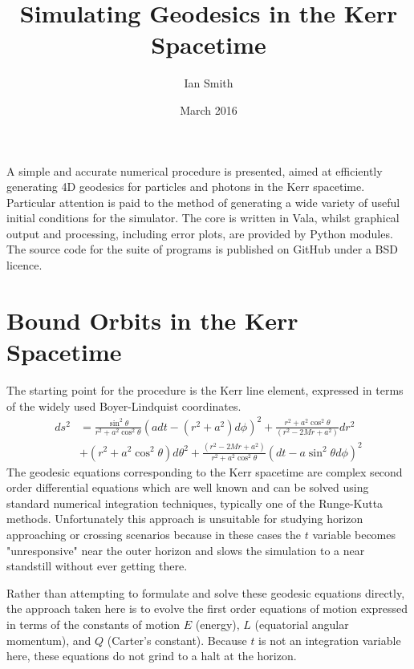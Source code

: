 \documentclass[11pt]{article}
\title{\textbf{Simulating Geodesics in the Kerr Spacetime}}
\author{Ian Smith}
\date{March 2016}
\begin{document}
\maketitle

\abstract
A simple and accurate numerical procedure is presented, aimed at efficiently generating 4D geodesics for particles and photons in the Kerr spacetime.  Particular attention is paid to the method of generating a wide variety of useful initial conditions for the simulator.  The core is written in Vala, whilst graphical output and processing, including error plots, are provided by Python modules.  The source code for the suite of programs is published on GitHub under a BSD licence.

\section{Bound Orbits in the Kerr Spacetime}

The starting point for the procedure is the Kerr line element, expressed in terms of the widely used Boyer-Lindquist coordinates.
\begin{equation}
\begin{aligned}
d s^2 &= \frac{ \sin^2 \theta } {r^2 + a^2 \cos^2 \theta} (a dt - (r^2 + a^2)d \phi )^2 + \frac{ r^2 + a^2 \cos^2 \theta } {(r^2 - 2Mr  + a^2)} d r^2 \\
&+ (r^2 + a^2 \cos^2 \theta) d \theta^2 + \frac{ (r^2 - 2Mr  + a^2) } {r^2 + a^2 \cos^2 \theta} (dt - a \sin^2 \theta d \phi )^2
\end{aligned}
\end{equation}
The geodesic equations corresponding to the Kerr spacetime are complex second order differential equations which are well known and can be solved using standard numerical integration techniques, typically one of the Runge-Kutta methods.  Unfortunately this approach is unsuitable for studying horizon approaching or crossing scenarios because in these cases the $t$ variable becomes "unresponsive" near the outer horizon and slows the simulation to a near standstill without ever getting there.

Rather than attempting to formulate and solve these geodesic equations directly, the approach taken here is to evolve the first order equations of motion expressed in terms of the constants of motion $E$ (energy), $L$ (equatorial angular momentum), and $Q$ (Carter's constant).  Because $t$ is not an integration variable here, these equations do not grind to a halt at the horizon.
\end{document}
